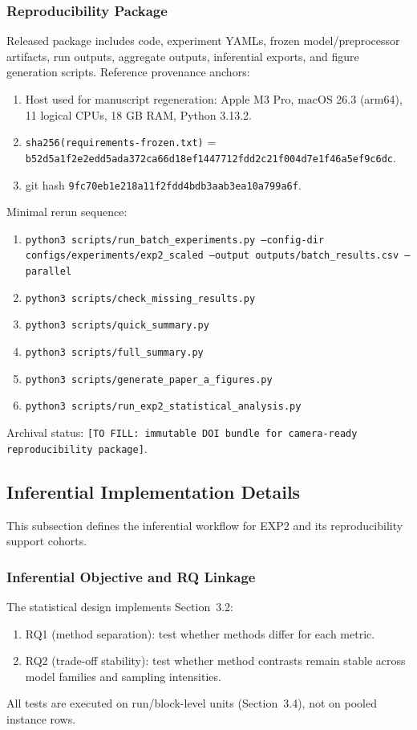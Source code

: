 \documentclass[twoside,11pt]{article}
\begin{document}
\subsubsection{Reproducibility Package}
Released package includes code, experiment YAMLs, frozen model/preprocessor
artifacts, run outputs, aggregate outputs, inferential exports, and figure
generation scripts.
Reference provenance anchors:
\begin{enumerate}[leftmargin=*]
    \item Host used for manuscript regeneration: Apple M3 Pro, macOS 26.3 (arm64), 11 logical CPUs, 18 GB RAM, Python 3.13.2.
    \item \texttt{sha256(requirements-frozen.txt)} = \texttt{b52d5a1f2e2edd5ada372ca66d18ef1447712fdd2c21f004d7e1f46a5ef9c6dc}.
    \item {} git hash \texttt{9fc70eb1e218a11f2fdd4bdb3aab3ea10a799a6f}.
\end{enumerate}
Minimal rerun sequence:
\begin{enumerate}[leftmargin=*]
    \item \texttt{python3 scripts/run\_batch\_experiments.py --config-dir configs/experiments/exp2\_scaled --output outputs/batch\_results.csv --parallel}
    \item \texttt{python3 scripts/check\_missing\_results.py}
    \item \texttt{python3 scripts/quick\_summary.py}
    \item \texttt{python3 scripts/full\_summary.py}
    \item \texttt{python3 scripts/generate\_paper\_a\_figures.py}
    \item \texttt{python3 scripts/run\_exp2\_statistical\_analysis.py}
\end{enumerate}
Archival status:
\texttt{[TO FILL: immutable DOI bundle for camera-ready reproducibility package]}.

\subsection{Inferential Implementation Details}
This subsection defines the inferential workflow for EXP2 and its reproducibility
support cohorts.

\subsubsection{Inferential Objective and RQ Linkage}
The statistical design implements Section~3.2:
\begin{enumerate}[leftmargin=*]
    \item RQ1 (method separation): test whether methods differ for each metric.
    \item RQ2 (trade-off stability): test whether method contrasts remain stable
    across model families and sampling intensities.
\end{enumerate}
All tests are executed on run/block-level units (Section~3.4), not on pooled
instance rows.
\end{document}
